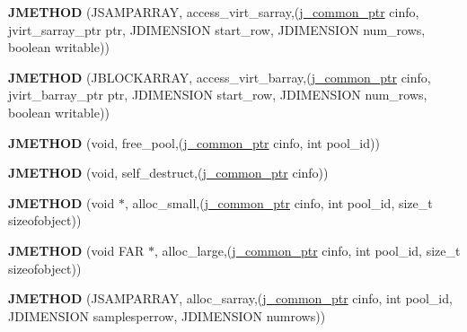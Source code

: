 \begin{DoxyCompactItemize}
\item 
\mbox{\label{structjpeg__memory__mgr_a747ad4316a4794b13f9fdff4f6f699ca}} 
{\bfseries J\+M\+E\+T\+H\+OD} (J\+S\+A\+M\+P\+A\+R\+R\+AY, access\+\_\+virt\+\_\+sarray,(\hyperlink{structjpeg__common__struct}{j\+\_\+common\+\_\+ptr} cinfo, jvirt\+\_\+sarray\+\_\+ptr ptr, J\+D\+I\+M\+E\+N\+S\+I\+ON start\+\_\+row, J\+D\+I\+M\+E\+N\+S\+I\+ON num\+\_\+rows, boolean writable))
\item 
\mbox{\label{structjpeg__memory__mgr_aa460f4b500825e051306b8ce5583d052}} 
{\bfseries J\+M\+E\+T\+H\+OD} (J\+B\+L\+O\+C\+K\+A\+R\+R\+AY, access\+\_\+virt\+\_\+barray,(\hyperlink{structjpeg__common__struct}{j\+\_\+common\+\_\+ptr} cinfo, jvirt\+\_\+barray\+\_\+ptr ptr, J\+D\+I\+M\+E\+N\+S\+I\+ON start\+\_\+row, J\+D\+I\+M\+E\+N\+S\+I\+ON num\+\_\+rows, boolean writable))
\item 
\mbox{\label{structjpeg__memory__mgr_a7e7e063767441999982d22c5cc0e9423}} 
{\bfseries J\+M\+E\+T\+H\+OD} (void, free\+\_\+pool,(\hyperlink{structjpeg__common__struct}{j\+\_\+common\+\_\+ptr} cinfo, int pool\+\_\+id))
\item 
\mbox{\label{structjpeg__memory__mgr_ae80ddea0ba4f845f91d3a30e350b5f44}} 
{\bfseries J\+M\+E\+T\+H\+OD} (void, self\+\_\+destruct,(\hyperlink{structjpeg__common__struct}{j\+\_\+common\+\_\+ptr} cinfo))
\item 
\mbox{\label{structjpeg__memory__mgr_a9372ad24444dda23175cc9203105911c}} 
{\bfseries J\+M\+E\+T\+H\+OD} (void $\ast$, alloc\+\_\+small,(\hyperlink{structjpeg__common__struct}{j\+\_\+common\+\_\+ptr} cinfo, int pool\+\_\+id, size\+\_\+t sizeofobject))
\item 
\mbox{\label{structjpeg__memory__mgr_a130f6dbc700cc045bdbe35beff2cb326}} 
{\bfseries J\+M\+E\+T\+H\+OD} (void F\+AR $\ast$, alloc\+\_\+large,(\hyperlink{structjpeg__common__struct}{j\+\_\+common\+\_\+ptr} cinfo, int pool\+\_\+id, size\+\_\+t sizeofobject))
\item 
\mbox{\label{structjpeg__memory__mgr_a3fdd2e1dfdc089fd61f17b608c0263f2}} 
{\bfseries J\+M\+E\+T\+H\+OD} (J\+S\+A\+M\+P\+A\+R\+R\+AY, alloc\+\_\+sarray,(\hyperlink{structjpeg__common__struct}{j\+\_\+common\+\_\+ptr} cinfo, int pool\+\_\+id, J\+D\+I\+M\+E\+N\+S\+I\+ON samplesperrow, J\+D\+I\+M\+E\+N\+S\+I\+ON numrows))

\end{DoxyCompactItemize}
